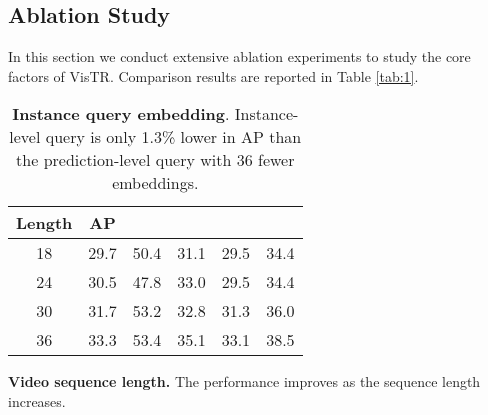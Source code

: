 \documentclass[final]{cvpr}
\def\Ours{{VisTR}\xspace}
\begin{document}
{\subsection{Ablation Study}

In this section we conduct extensive ablation experiments to study the core factors of \Ours.
Comparison results are 
reported
in Table \ref{tab:1}.

\begin{table*}[!t]
\small
\begin{subtable}{0.5\linewidth}
\centering
\captionsetup{width=0.9\linewidth}
\begin{tabular}{c|c|cccc}
Length & AP &  &  &  &  \\
\hline
18&29.7&50.4&31.1&29.5&34.4\\
24&30.5&47.8&33.0&29.5&34.4\\
30&31.7&53.2&32.8&31.3&36.0\\
36&33.3&53.4&35.1&33.1&38.5
\end{tabular}
\caption{\textbf{Video sequence length.} 
The performance improves as the sequence length increases.
}
\label{tab:length}
\end{subtable}\begin{subtable}{0.5\linewidth}
\centering
\captionsetup{width=0.9\linewidth}
\caption{\textbf{Instance query embedding}. 
Instance-level query is only 1.3\%  lower in AP than the prediction-level query with 36 fewer embeddings. }
\label{tab:query}
\end{subtable}


\end{table*}}
\end{document}
